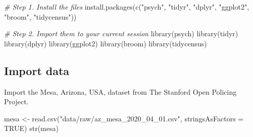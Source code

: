 \documentclass[
]{article}
\newenvironment{Shaded}{\begin{snugshade}}{\end{snugshade}}
\newcommand{\AttributeTok}[1]{\textcolor[rgb]{0.77,0.63,0.00}{#1}}
\newcommand{\CommentTok}[1]{\textcolor[rgb]{0.56,0.35,0.01}{\textit{#1}}}
\newcommand{\ConstantTok}[1]{\textcolor[rgb]{0.00,0.00,0.00}{#1}}
\newcommand{\FunctionTok}[1]{\textcolor[rgb]{0.00,0.00,0.00}{#1}}
\newcommand{\NormalTok}[1]{#1}
\newcommand{\OtherTok}[1]{\textcolor[rgb]{0.56,0.35,0.01}{#1}}
\newcommand{\StringTok}[1]{\textcolor[rgb]{0.31,0.60,0.02}{#1}}
\begin{document}
\begin{Shaded}
\begin{Highlighting}[]
\CommentTok{\# Step 1. Install the files }
\FunctionTok{install.packages}\NormalTok{(}\FunctionTok{c}\NormalTok{(}\StringTok{"psych"}\NormalTok{, }\StringTok{"tidyr"}\NormalTok{, }\StringTok{"dplyr"}\NormalTok{, }\StringTok{"ggplot2"}\NormalTok{, }\StringTok{"broom"}\NormalTok{, }\StringTok{"tidycensus"}\NormalTok{))}

\CommentTok{\# Step 2. Import them to your current session}
\FunctionTok{library}\NormalTok{(psych)}
\FunctionTok{library}\NormalTok{(tidyr)}
\FunctionTok{library}\NormalTok{(dplyr)}
\FunctionTok{library}\NormalTok{(ggplot2)}
\FunctionTok{library}\NormalTok{(broom)}
\FunctionTok{library}\NormalTok{(tidycensus)}
\end{Highlighting}
\end{Shaded}

\hypertarget{import-data}{%
\subsection{Import data}\label{import-data}}

Import the Mesa, Arizona, USA, dataset from The Stanford Open Policing
Project.

\begin{Shaded}
\begin{Highlighting}[]
\NormalTok{mesa }\OtherTok{\textless{}{-}} \FunctionTok{read.csv}\NormalTok{(}\StringTok{"data/raw/az\_mesa\_2020\_04\_01.csv"}\NormalTok{, }
                 \AttributeTok{stringsAsFactors =} \ConstantTok{TRUE}\NormalTok{)}
\FunctionTok{str}\NormalTok{(mesa)}
\end{Highlighting}
\end{Shaded}
\end{document}
